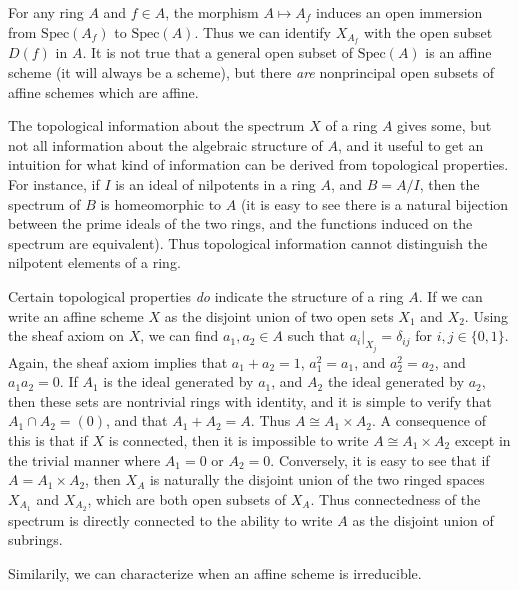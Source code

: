 For any ring $A$ and $f \in A$, the morphism $A \mapsto A_f$ induces an open immersion from $\text{Spec}(A_f)$ to $\text{Spec}(A)$. Thus we can identify $X_{A_f}$ with the open subset $D(f)$ in $A$. It is not true that a general open subset of $\text{Spec}(A)$ is an affine scheme (it will always be a scheme), but there \emph{are} nonprincipal open subsets of affine schemes which are affine.

The topological information about the spectrum $X$ of a ring $A$ gives some, but not all information about the algebraic structure of $A$, and it useful to get an intuition for what kind of information can be derived from topological properties. For instance, if $I$ is an ideal of nilpotents in a ring $A$, and $B = A/I$, then the spectrum of $B$ is homeomorphic to $A$ (it is easy to see there is a natural bijection between the prime ideals of the two rings, and the functions induced on the spectrum are equivalent). Thus topological information cannot distinguish the nilpotent elements of a ring.

Certain topological properties \emph{do} indicate the structure of a ring $A$. If we can write an affine scheme $X$ as the disjoint union of two open sets $X_1$ and $X_2$. Using the sheaf axiom on $X$, we can find $a_1,a_2 \in A$ such that $a_i|_{X_j} = \delta_{ij}$ for $i,j \in \{ 0, 1 \}$. Again, the sheaf axiom implies that $a_1 + a_2 = 1$, $a_1^2 = a_1$, and $a_2^2 = a_2$, and $a_1a_2 = 0$. If $A_1$ is the ideal generated by $a_1$, and $A_2$ the ideal generated by $a_2$, then these sets are nontrivial rings with identity, and it is simple to verify that $A_1 \cap A_2 = (0)$, and that $A_1 + A_2 = A$. Thus $A \cong A_1 \times A_2$. A consequence of this is that if $X$ is connected, then it is impossible to write $A \cong A_1 \times A_2$ except in the trivial manner where $A_1 = 0$ or $A_2 = 0$. Conversely, it is easy to see that if $A = A_1 \times A_2$, then $X_A$ is naturally the disjoint union of the two ringed spaces $X_{A_1}$ and $X_{A_2}$, which are both open subsets of $X_A$. Thus connectedness of the spectrum is directly connected to the ability to write $A$ as the disjoint union of subrings.

Similarily, we can characterize when an affine scheme is irreducible.

